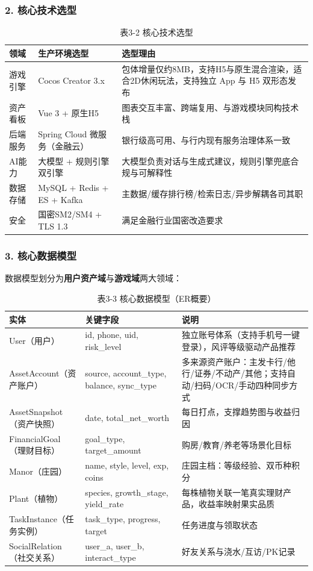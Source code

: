 \documentclass[12pt,a4paper]{ctexart}
\newcommand{\sub}[1]{\subsubsection*{#1}}
\begin{document}
\sub{2. 核心技术选型}
\begin{table}[htbp]
\centering
\begin{tabular}{p{3cm}p{4.5cm}p{5cm}}
\toprule
\textbf{领域} & \textbf{生产环境选型} & \textbf{选型理由} \\
\midrule
游戏引擎 & Cocos Creator 3.x & 包体增量仅约8MB，支持H5与原生混合渲染，适合2D休闲玩法，支持独立 App 与 H5 双形态发布 \\
资产看板 & Vue 3 + 原生H5 & 图表交互丰富、跨端复用、与游戏模块同构技术栈 \\
后端服务 & Spring Cloud 微服务（金融云） & 银行级高可用、与行内现有服务治理体系一致 \\
AI能力 & 大模型 + 规则引擎双引擎 & 大模型负责对话与生成式建议，规则引擎兜底合规与可解释性 \\
数据存储 & MySQL + Redis + ES + Kafka & 主数据/缓存排行榜/检索日志/异步解耦各司其职 \\
安全 & 国密SM2/SM4 + TLS 1.3 & 满足金融行业国密改造要求 \\
\bottomrule
\end{tabular}
\caption*{表3-2 \quad 核心技术选型}
\end{table}

\sub{3. 核心数据模型}
数据模型划分为\textbf{用户资产域}与\textbf{游戏域}两大领域：
\begin{table}[htbp]
\centering
\begin{tabular}{p{3.2cm}p{4.2cm}p{5.2cm}}
\toprule
\textbf{实体} & \textbf{关键字段} & \textbf{说明} \\
\midrule
User（用户） & id, phone, uid, risk\_level & 独立账号体系（支持手机号一键登录），风评等级驱动产品推荐 \\
AssetAccount（资产账户） & source, account\_type, balance, sync\_type & 多来源资产账户：主发卡行/他行/证券/不动产/其他；支持自动/扫码/OCR/手动四种同步方式 \\
AssetSnapshot（资产快照） & date, total\_net\_worth & 每日打点，支撑趋势图与收益归因 \\
FinancialGoal（理财目标） & goal\_type, target\_amount & 购房/教育/养老等场景化目标 \\
Manor（庄园） & name, style, level, exp, coins & 庄园主档：等级经验、双币种积分 \\
Plant（植物） & species, growth\_stage, yield\_rate & 每株植物关联一笔真实理财产品，收益率映射果实品质 \\
TaskInstance（任务实例） & task\_type, progress, target & 任务进度与领取状态 \\
SocialRelation（社交关系） & user\_a, user\_b, interact\_type & 好友关系与浇水/互访/PK记录 \\
\bottomrule
\end{tabular}
\caption*{表3-3 \quad 核心数据模型（ER概要）}
\end{table}
\end{document}
